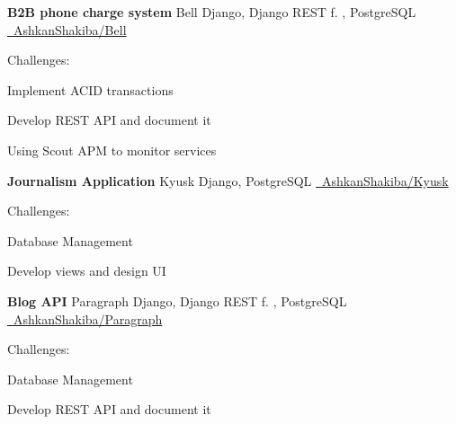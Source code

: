 \documentclass[]{awesome-cv}
\begin{document}
\vspace{-2mm}
\begin{cventries}
	\cventry
	{\textbf{B2B phone charge system}}
	{Bell}
	{Django, Django REST f. , PostgreSQL}
	{\href{https://github.com/AshkanShakiba/Bell}{\faGithub\ AshkanShakiba/Bell}}
	{\begin{cvitems}
		\vspace{1mm}
		\item[] {\hspace{-9mm} Challenges:}
		\vspace{1mm}
		\item {Implement ACID transactions}
		\vspace{1mm}
		\item {Develop REST API and document it}
		\vspace{1mm}
		\item {Using Scout APM to monitor services}
	\end{cvitems}}
	\vspace{0mm}
	\cventry
	{\textbf{Journalism Application}}
	{Kyusk}
	{Django, PostgreSQL}
	{\href{https://github.com/AshkanShakiba/Kyusk}{\faGithub\ AshkanShakiba/Kyusk}}
	{\begin{cvitems}
		\vspace{1mm}
		\item[] {\hspace{-9mm} Challenges:}
		\vspace{1mm}
		\item {Database Management}
		\vspace{1mm}
		\item {Develop views and design UI}
	\end{cvitems}}
	\vspace{0mm}
	\cventry
	{\textbf{Blog API}}
	{Paragraph}
	{Django, Django REST f. , PostgreSQL}
	{\href{https://github.com/AshkanShakiba/Paragraph}{\faGithub\ AshkanShakiba/Paragraph}}
	{\begin{cvitems}
		\vspace{1mm}
		\item[] {\hspace{-9mm} Challenges:}
		\vspace{1mm}
		\item {Database Management}
		\vspace{1mm}
		\item {Develop REST API and document it}
	\end{cvitems}}

\end{cventries}
\end{document}
